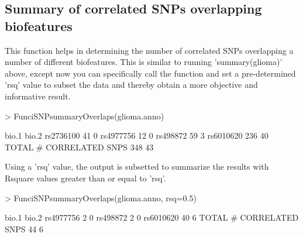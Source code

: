 \documentclass[a4paper]{article}
\begin{document}
\subsection*{Summary of correlated SNPs overlapping biofeatures}
This function helps in determining the number of correlated SNPs overlapping 
a number of different biofeatures. This is similar to running 'summary(glioma)'
above, except now you can specifically call the function and set a 
pre-determined 'rsq' value to subset the data and thereby obtain a 
more objective and informative result.
\begin{Schunk}
\begin{Sinput}
> FunciSNPsummaryOverlaps(glioma.anno)
\end{Sinput}
\begin{Soutput}
                        bio.1 bio.2
rs2736100                  41     0
rs4977756                  12     0
rs498872                   59     3
rs6010620                 236    40
TOTAL # CORRELATED SNPS   348    43
\end{Soutput}
\end{Schunk}
Using a 'rsq' value, the output is subsetted to summarize the results with 
Rsquare values greater than or equal to 'rsq'.
\begin{Schunk}
\begin{Sinput}
> FunciSNPsummaryOverlaps(glioma.anno, rsq=0.5)
\end{Sinput}
\begin{Soutput}
                        bio.1 bio.2
rs4977756                   2     0
rs498872                    2     0
rs6010620                  40     6
TOTAL # CORRELATED SNPS    44     6
\end{Soutput}
\end{Schunk}
\end{document}
